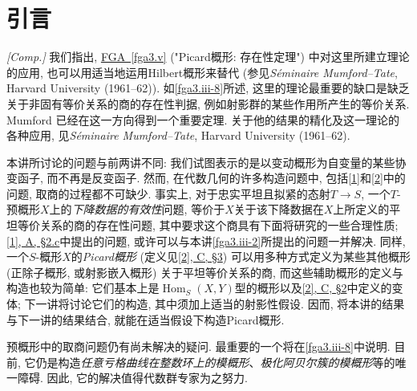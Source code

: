 \chapter{引言}\thispagestyle{fancy}\label{fga3.iii-introduction}
\begin{remark}{}\label{fga3.iii-introduction-remark}\skipsinglepar
\par{}\emph{[Comp.]} 我们指出, \hyperref[fga3.v]{FGA~\ref*{fga3.v}} ("Picard概形: 存在性定理") 中对这里所建立理论的应用, 也可以用适当地运用Hilbert概形来替代 (参见\emph{Séminaire Mumford–Tate}, Harvard University (1961–62)). 如\cref{fga3.iii-8}所述, 这里的理论最重要的缺口是缺乏关于非固有等价关系的商的存在性判据, 例如射影群的某些作用所产生的等价关系. Mumford \cite{Mum1961} 已经在这一方向得到一个重要定理. 关于他的结果的精化及这一理论的各种应用, 见\emph{Séminaire Mumford–Tate}, Harvard University (1961–62).
\end{remark}
\par{}本讲所讨论的问题与前两讲不同: 我们试图表示的是以变动概形为自变量的某些协变函子, 而不再是反变函子. 然而, 在代数几何的许多构造问题中, 包括\hyperref[fga3.i]{[1]}和\hyperref[fga3.ii]{[2]}中的问题, 取商的过程都不可缺少. 事实上, 对于忠实平坦且拟紧的态射\(T\to  S\), 一个\(T\)-预概形\(X\)上的\emph{下降数据的有效性}问题, 等价于\(X\)关于该下降数据在\(X\)上所定义的平坦等价关系的商的存在性问题, 其中要求这个商具有下面将研究的一些合理性质; \hyperref[fga3.i-a.2.c]{[1], A, §2.c}中提出的问题, 或许可以与本讲\cref{fga3.iii-2}所提出的问题一并解决. 同样, 一个\(S\)-概形\(X\)的\emph{Picard概形} (定义见\hyperref[fga3.ii-c.3]{[2], C, §3}) 可以用多种方式定义为某些其他概形 (正除子概形, 或射影嵌入概形) 关于平坦等价关系的商, 而这些辅助概形的定义与构造也较为简单: 它们基本上是\(\operatorname {Hom}_S(X,Y)\)型的概形以及\hyperref[fga3.ii-c.2]{[2], C, §2}中定义的变体; 下一讲将讨论它们的构造, 其中须加上适当的射影性假设. 因而, 将本讲的结果与下一讲的结果结合, 就能在适当假设下构造Picard概形.
\par{}预概形中的取商问题仍有尚未解决的疑问. 最重要的一个将在\cref{fga3.iii-8}中说明. 目前, 它仍是构造\emph{任意亏格曲线在整数环上的模概形}、\emph{极化阿贝尔簇的模概形}等的唯一障碍. 因此, 它的解决值得代数群专家为之努力.
